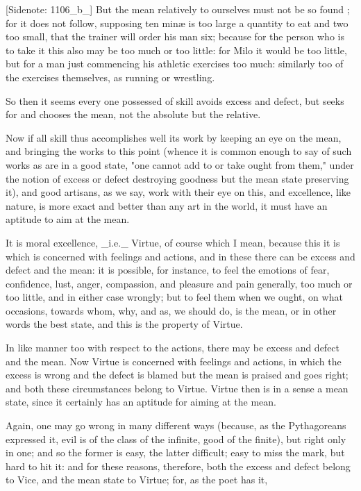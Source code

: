[Sidenote: 1106_b_] But the mean relatively to ourselves must not be
so found ; for it does not follow, supposing ten minæ is too large a
quantity to eat and two too small, that the trainer will order his man
six; because for the person who is to take it this also may be too much
or too little: for Milo it would be too little, but for a man just
commencing his athletic exercises too much: similarly too of the
exercises themselves, as running or wrestling.

So then it seems every one possessed of skill avoids excess and defect,
but seeks for and chooses the mean, not the absolute but the relative.

Now if all skill thus accomplishes well its work by keeping an eye on
the mean, and bringing the works to this point (whence it is common
enough to say of such works as are in a good state, "one cannot add
to or take ought from them," under the notion of excess or defect
destroying goodness but the mean state preserving it), and good
artisans, as we say, work with their eye on this, and excellence, like
nature, is more exact and better than any art in the world, it must have
an aptitude to aim at the mean.

It is moral excellence, _i.e._ Virtue, of course which I mean, because
this it is which is concerned with feelings and actions, and in these
there can be excess and defect and the mean: it is possible, for
instance, to feel the emotions of fear, confidence, lust, anger,
compassion, and pleasure and pain generally, too much or too little,
and in either case wrongly; but to feel them when we ought, on what
occasions, towards whom, why, and as, we should do, is the mean, or in
other words the best state, and this is the property of Virtue.

In like manner too with respect to the actions, there may be excess and
defect and the mean. Now Virtue is concerned with feelings and actions,
in which the excess is wrong and the defect is blamed but the mean is
praised and goes right; and both these circumstances belong to Virtue.
Virtue then is in a sense a mean state, since it certainly has an
aptitude for aiming at the mean.

Again, one may go wrong in many different ways (because, as the
Pythagoreans expressed it, evil is of the class of the infinite, good
of the finite), but right only in one; and so the former is easy, the
latter difficult; easy to miss the mark, but hard to hit it: and for
these reasons, therefore, both the excess and defect belong to Vice, and
the mean state to Virtue; for, as the poet has it,

